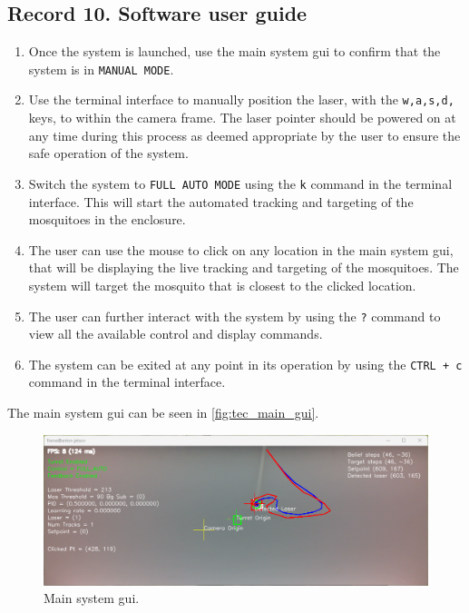 \subsection{Record 10. Software user guide}\label{subsec:software_user_guide}
\begin{enumerate}
  \item Once the system is launched, use the main system \gls{gui} to confirm that the system is in \texttt{MANUAL MODE}.
  \item Use the terminal interface to manually position the laser, with the \texttt{w,a,s,d,} keys, to within the camera frame. The laser pointer should be powered on at any time during this process as deemed appropriate by the user to ensure the safe operation of the system.
  \item Switch the system to \texttt{FULL AUTO MODE} using the \texttt{k} command in the terminal interface. This will start the automated tracking and targeting of the mosquitoes in the enclosure.
  \item The user can use the mouse to click on any location in the main system \gls{gui}, that will be displaying the live tracking and targeting of the mosquitoes. The system will target the mosquito that is closest to the clicked location.
  \item The user can further interact with the system by using the \texttt{?} command to view all the available control and display commands.
  \item The system can be exited at any point in its operation by using the \texttt{CTRL\,+\,c} command in the terminal interface.
\end{enumerate}

The main system \gls{gui} can be seen in \autoref{fig:tec_main_gui}.
\begin{figure}[H]
  \centering
  \includegraphics[width=\textwidth]{figures/main_gui.png}
  \caption{Main system \gls{gui}.}
  \label{fig:tec_main_gui}
\end{figure}




